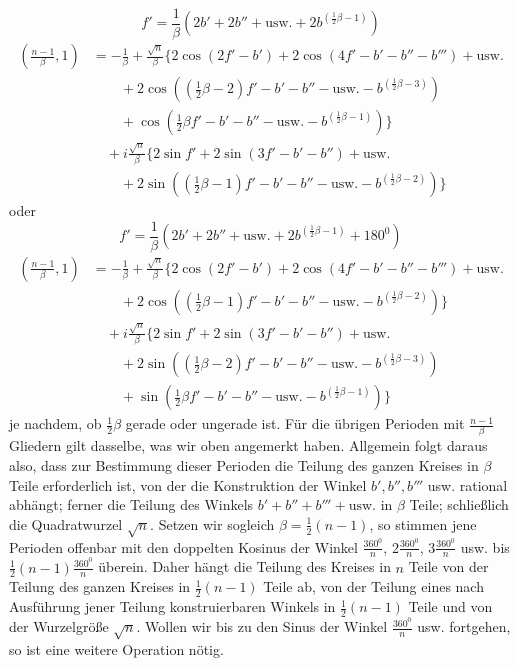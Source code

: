 \begingroup{}
\[
f'=\frac1\beta(2b'+2b''+\text{usw.}+2b^{(\frac12\beta-1)})
\]
\endgroup
\[
\begin{aligned}
\left(\frac{n-1}\beta,1\right)&=-\frac1\beta+\frac{\surd n}\beta\{2\cos(2f'-b')+2\cos(4f'-b'-b''-b''')+\text{usw.}\\
&\qquad+2\cos((\tfrac12\beta-2)f'-b'-b''-\text{usw.}-b^{(\frac12\beta-3)})\\
&\qquad+\cos(\tfrac12\beta f'-b'-b''-\text{usw.}-b^{(\frac12\beta-1)})\}\\
&\quad+i\frac{\surd n}\beta\{2\sin f'+2\sin(3f'-b'-b'')+\text{usw.}\\
&\qquad+2\sin((\tfrac12\beta-1)f'-b'-b''-\text{usw.}-b^{(\frac12\beta-2)})\}
\end{aligned}
\]
oder
\[
f'=\frac1\beta(2b'+2b''+\text{usw.}+2b^{(\frac12\beta-1)}+180^0)
\]
\[
\begin{aligned}
\left(\frac{n-1}\beta,1\right)&=-\frac1\beta+\frac{\surd n}\beta\{2\cos(2f'-b')+2\cos(4f'-b'-b''-b''')+\text{usw.}\\
&\qquad+2\cos((\tfrac12\beta-1)f'-b'-b''-\text{usw.}-b^{(\frac12\beta-2)})\}\\
&\quad+i\frac{\surd n}\beta\{2\sin f'+2\sin(3f'-b'-b'')+\text{usw.}\\
&\qquad+2\sin((\tfrac12\beta-2)f'-b'-b''-\text{usw.}-b^{(\frac12\beta-3)})\\
&\qquad+\sin(\tfrac12\beta f'-b'-b''-\text{usw.}-b^{(\frac12\beta-1)})\}
\end{aligned}
\]
je nachdem, ob $\frac12\beta$ gerade oder ungerade ist. Für die übrigen Perioden mit $\frac{n-1}\beta$ Gliedern gilt dasselbe, was wir oben angemerkt haben. Allgemein folgt daraus also, dass zur Bestimmung dieser Perioden die Teilung des ganzen Kreises in $\beta$ Teile erforderlich ist, von der die
Konstruktion der Winkel $b',b'',b'''$ usw. rational abhängt; ferner die Teilung des Winkels $b'+b''+b'''+\text{usw.}$ in $\beta$ Teile; schließlich die Quadratwurzel $\surd n$. Setzen wir sogleich $\beta=\frac12(n-1)$, so stimmen jene Perioden offenbar mit den doppelten Kosinus der Winkel $\frac{360^0}n$, $2\frac{360^0}n$, $3\frac{360^0}n$ usw. bis $\frac12(n-1)\frac{360^0}n$ überein. Daher hängt die Teilung des Kreises in $n$ Teile von der Teilung des ganzen Kreises in $\frac12(n-1)$ Teile ab, von der Teilung eines nach Ausführung jener Teilung konstruierbaren Winkels in $\frac12(n-1)$ Teile und von der Wurzelgröße $\surd n$. Wollen wir bis zu den Sinus der Winkel $\frac{360^0}n$ usw. fortgehen, so ist eine weitere Operation nötig.
